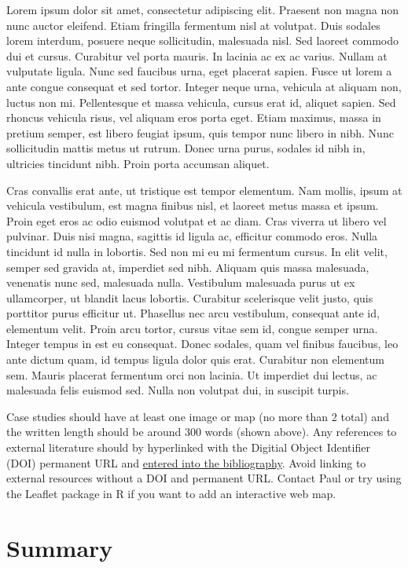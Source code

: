 \documentclass[
]{book}
\begin{document}
Lorem ipsum dolor sit amet, consectetur adipiscing elit. Praesent non magna non nunc auctor eleifend. Etiam fringilla fermentum nisl at volutpat. Duis sodales lorem interdum, posuere neque sollicitudin, malesuada nisl. Sed laoreet commodo dui et cursus. Curabitur vel porta mauris. In lacinia ac ex ac varius. Nullam at vulputate ligula. Nunc sed faucibus urna, eget placerat sapien. Fusce ut lorem a ante congue consequat et sed tortor. Integer neque urna, vehicula at aliquam non, luctus non mi. Pellentesque et massa vehicula, cursus erat id, aliquet sapien. Sed rhoncus vehicula risus, vel aliquam eros porta eget. Etiam maximus, massa in pretium semper, est libero feugiat ipsum, quis tempor nunc libero in nibh. Nunc sollicitudin mattis metus ut rutrum. Donec urna purus, sodales id nibh in, ultricies tincidunt nibh. Proin porta accumsan aliquet.

Cras convallis erat ante, ut tristique est tempor elementum. Nam mollis, ipsum at vehicula vestibulum, est magna finibus nisl, et laoreet metus massa et ipsum. Proin eget eros ac odio euismod volutpat et ac diam. Cras viverra ut libero vel pulvinar. Duis nisi magna, sagittis id ligula ac, efficitur commodo eros. Nulla tincidunt id nulla in lobortis. Sed non mi eu mi fermentum cursus. In elit velit, semper sed gravida at, imperdiet sed nibh. Aliquam quis massa malesuada, venenatis nunc sed, malesuada nulla. Vestibulum malesuada purus ut ex ullamcorper, ut blandit lacus lobortis. Curabitur scelerisque velit justo, quis porttitor purus efficitur ut. Phasellus nec arcu vestibulum, consequat ante id, elementum velit. Proin arcu tortor, cursus vitae sem id, congue semper urna. Integer tempus in est eu consequat. Donec sodales, quam vel finibus faucibus, leo ante dictum quam, id tempus ligula dolor quis erat. Curabitur non elementum sem. Mauris placerat fermentum orci non lacinia. Ut imperdiet dui lectus, ac malesuada felis euismod sed. Nulla non volutpat dui, in suscipit turpis.

Case studies should have at least one image or map (no more than 2 total) and the written length should be around 300 words (shown above). Any references to external literature should by hyperlinked with the Digitial Object Identifier (DOI) permanent URL and \href{https://bookdown.org/yihui/bookdown/citations.html}{entered into the bibliography}. Avoid linking to external resources without a DOI and permanent URL. Contact Paul or try using the Leaflet package in R if you want to add an interactive web map.

\hypertarget{summary-9}{%
\section{Summary}\label{summary-9}}
\end{document}

